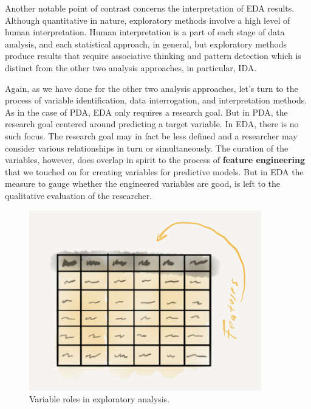 \documentclass[
  letterpaper,
]{latex/krantz}
\begin{document}
Another notable point of contrast concerns the interpretation of EDA
results. Although quantitative in nature, exploratory methods involve a
high level of human interpretation. Human interpretation is a part of
each stage of data analysis, and each statistical approach, in general,
but exploratory methods produce results that require associative
thinking and pattern detection which is distinct from the other two
analysis approaches, in particular, IDA.

Again, as we have done for the other two analysis approaches, let's turn
to the process of variable identification, data interrogation, and
interpretation methods. As in the case of PDA, EDA only requires a
research goal. But in PDA, the research goal centered around predicting
a target variable. In EDA, there is no such focus. The research goal may
in fact be less defined and a researcher may consider various
relationships in turn or simultaneously. The curation of the variables,
however, does overlap in spirit to the process of \textbf{feature
engineering} that we touched on for creating variables for predictive
models. But in EDA the measure to gauge whether the engineered variables
are good, is left to the qualitative evaluation of the researcher.

\begin{figure}[h]

{\centering \includegraphics[width=0.9\textwidth,height=\textheight]{./figures/approaching-analysis/exploratory-variables.png}

}

\caption{\label{fig-aa-exploratory-variables}Variable roles in
exploratory analysis.}

\end{figure}
\end{document}
